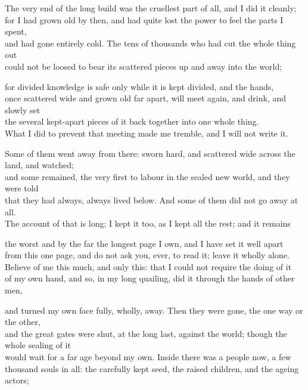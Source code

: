 \begin{scripture}
The very end of the long build was the cruellest part of all, and I did it cleanly; \\
for I had grown old by then, and had quite lost the power to feel the parts I spent, \\
and had gone entirely cold. The tens of thousands who had cut the whole thing out \\
could not be loosed to bear its scattered pieces up and away into the world; \\
\medskip

for divided knowledge is safe only while it is kept divided, and the hands, \\
once scattered wide and grown old far apart, will meet again, and drink, and slowly set \\
the several kept-apart pieces of it back together into one whole thing. \\
What I did to prevent that meeting made me tremble, and I will not write it. \\
\medskip

Some of them went away from there: sworn hard, and scattered wide across the land, and watched; \\
and some remained, the very first to labour in the sealed new world, and they were told \\
that they had always, always lived below. And some of them did not go away at all. \\
The account of that is long; I kept it too, as I kept all the rest; and it remains \\
\medskip

the worst and by the far the longest page I own, and I have set it well apart \\
from this one page, and do not ask you, ever, to read it; leave it wholly alone. \\
Believe of me this much, and only this: that I could not require the doing of it \\
of my own hand, and so, in my long quailing, did it through the hands of other men, \\
\medskip

and turned my own face fully, wholly, away. Then they were gone, the one way or the other, \\
and the great gates were shut, at the long last, against the world; though the whole sealing of it \\
would wait for a far age beyond my own. Inside there was a people now, a few \\
thousand souls in all: the carefully kept seed, the raised children, and the ageing actors; \\
\medskip


\end{scripture}
